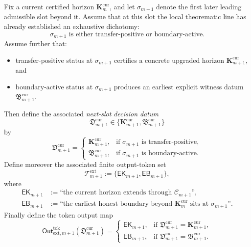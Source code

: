 \begin{definition}
\label{def:reusable-next-slot-decision-schema}
Fix a current certified horizon $\mathbf K_m^{\mathrm{cur}}$, and let $\sigma_{m+1}$ denote the first later leading admissible slot beyond it. Assume that at this slot the local theorematic line has already established an exhaustive dichotomy:
\[
\text{$\sigma_{m+1}$ is either transfer-positive or boundary-active.}
\]
Assume further that:
\begin{itemize}[leftmargin=2em]
  \item transfer-positive status at $\sigma_{m+1}$ certifies a concrete upgraded horizon $\mathbf K_{m+1}^{\mathrm{cur}}$, and
  \item boundary-active status at $\sigma_{m+1}$ produces an earliest explicit witness datum $\mathfrak B_{m+1}^{\mathrm{cur}}$.
\end{itemize}
Then define the associated \emph{next-slot decision datum}
\[
  \mathfrak D_{m+1}^{\mathrm{cur}}
  \in
  \{\mathbf K_{m+1}^{\mathrm{cur}},\mathfrak B_{m+1}^{\mathrm{cur}}\}
\]
by
\[
  \mathfrak D_{m+1}^{\mathrm{cur}}
  =
  \begin{cases}
    \mathbf K_{m+1}^{\mathrm{cur}}, & \text{if }\sigma_{m+1}\text{ is transfer-positive},\\[2mm]
    \mathfrak B_{m+1}^{\mathrm{cur}}, & \text{if }\sigma_{m+1}\text{ is boundary-active}.
  \end{cases}
\]
Define moreover the associated finite output-token set
\[
  \mathcal T^{\mathrm{ext}}_{m+1}
  :=
  \{\mathsf{EK}_{m+1},\mathsf{EB}_{m+1}\},
\]
where
\begin{align*}
  \mathsf{EK}_{m+1} &:= \text{``the current horizon extends through }\mathcal C_{m+1}\text{''},\\
  \mathsf{EB}_{m+1} &:= \text{``the earliest honest boundary beyond }\mathbf K_m^{\mathrm{cur}}\text{ sits at }\sigma_{m+1}\text{''}.
\end{align*}
Finally define the token output map
\[
  \mathsf{Out}^{\mathrm{tok}}_{\mathrm{ext},m+1}(\mathfrak D_{m+1}^{\mathrm{cur}})
  =
  \begin{cases}
    \mathsf{EK}_{m+1}, & \text{if }\mathfrak D_{m+1}^{\mathrm{cur}}=\mathbf K_{m+1}^{\mathrm{cur}},\\[2mm]
    \mathsf{EB}_{m+1}, & \text{if }\mathfrak D_{m+1}^{\mathrm{cur}}=\mathfrak B_{m+1}^{\mathrm{cur}}.
  \end{cases}
\]
\end{definition}

